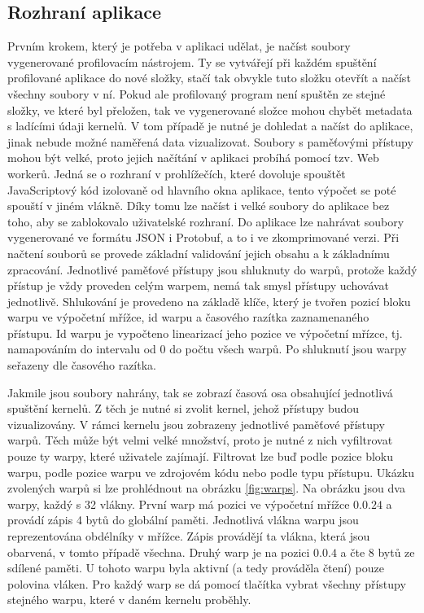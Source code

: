 \subsection{Rozhraní aplikace}
Prvním krokem, který je potřeba v aplikaci udělat, je načíst soubory vygenerované profilovacím nástrojem. Ty se vytvářejí při každém spuštění profilované aplikace do nové složky, stačí tak obvykle tuto složku otevřít a načíst všechny soubory v ní. Pokud ale profilovaný program není spuštěn ze stejné složky, ve které byl přeložen, tak ve vygenerované složce mohou chybět metadata s ladícími údaji kernelů. V tom případě je nutné je dohledat a načíst do aplikace, jinak nebude možné naměřená data vizualizovat. Soubory s paměťovými přístupy mohou být velké, proto jejich načítání v aplikaci probíhá pomocí tzv. Web workerů. Jedná se o rozhraní v prohlížečích, které dovoluje spouštět JavaScriptový kód izolovaně od hlavního okna aplikace, tento výpočet se poté spouští v jiném vlákně. Díky tomu lze načíst i velké soubory do aplikace bez toho, aby se zablokovalo uživatelské rozhraní. Do aplikace lze nahrávat soubory vygenerované ve formátu JSON i Protobuf, a to i ve zkomprimované verzi. Při načtení souborů se provede základní validování jejich obsahu a k základnímu zpracování. Jednotlivé paměťové přístupy jsou shluknuty do warpů, protože každý přístup je vždy proveden celým warpem, nemá tak smysl přístupy uchovávat jednotlivě. Shlukování je provedeno na základě klíče, který je tvořen pozicí bloku warpu ve výpočetní mřížce, id warpu a časového razítka zaznamenaného přístupu. Id warpu je vypočteno linearizací jeho pozice ve výpočetní mřízce, tj. namapováním do intervalu od 0 do počtu všech warpů. Po shluknutí jsou warpy seřazeny dle časového razítka. 

Jakmile jsou soubory nahrány, tak se zobrazí časová osa obsahující jednotlivá spuštění kernelů. Z těch je nutné si zvolit kernel, jehož přístupy budou vizualizovány. V rámci kernelu jsou zobrazeny jednotlivé paměťové přístupy warpů. Těch může být velmi velké množství, proto je nutné z nich vyfiltrovat pouze ty warpy, které uživatele zajímají. Filtrovat lze buď podle pozice bloku warpu, podle pozice warpu ve zdrojovém kódu nebo podle typu přístupu. Ukázku zvolených warpů si lze prohlédnout na obrázku \ref{fig:warps}.
Na obrázku jsou dva warpy, každý s 32 vlákny. První warp má pozici ve výpočetní mřížce $0.0.24$ a provádí zápis 4 bytů do globální paměti. Jednotlivá vlákna warpu jsou reprezentována obdélníky v mřížce. Zápis provádějí ta vlákna, která jsou obarvená, v tomto případě všechna. Druhý warp je na pozici $0.0.4$ a čte 8 bytů ze sdílené paměti. U tohoto warpu byla aktivní (a tedy prováděla čtení) pouze polovina vláken. Pro každý warp se dá pomocí tlačítka vybrat všechny přístupy stejného warpu, které v daném kernelu proběhly.

